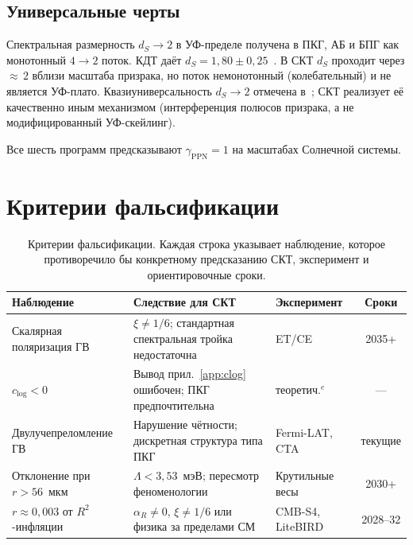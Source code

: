 \documentclass[12pt,a4paper]{article}
\theoremstyle{plain}
\theoremstyle{definition}
\theoremstyle{remark}
\begin{document}
{{{{{{\subsection{Универсальные черты}
\label{sec:universal}

Спектральная размерность $d_S \to 2$ в УФ-пределе получена в ПКГ,
АБ и БПГ как монотонный $4 \to 2$ поток. КДТ даёт
$d_S = 1{,}80 \pm 0{,}25$~\cite{AJL:2005}.
В СКТ $d_S$ проходит через ${\approx}\,2$ вблизи масштаба призрака,
но поток немонотонный (колебательный) и не является УФ-плато.
Квазиуниверсальность $d_S \to 2$ отмечена
в~\cite{Carlip:2017}; СКТ реализует её качественно иным механизмом
(интерференция полюсов призрака, а не модифицированный УФ-скейлинг).

Все шесть программ предсказывают $\gamma_{\mathrm{PPN}} = 1$ на
масштабах Солнечной системы.

\section{Критерии фальсификации}
\label{sec:falsification}

\begin{table}[ht]
\centering
\caption{Критерии фальсификации. Каждая строка указывает
наблюдение, которое противоречило бы конкретному предсказанию СКТ,
эксперимент и ориентировочные сроки.}
\label{tab:falsification}
\footnotesize
\setlength{\tabcolsep}{4pt}
\begin{tabular}{p{3.0cm}p{4.5cm}p{2.2cm}c}
\toprule
Наблюдение & Следствие для СКТ & Эксперимент & Сроки \\
\midrule
Скалярная поляризация ГВ &
  $\xi \neq 1/6$; стандартная спектральная тройка недостаточна &
  ET/CE & 2035+ \\[4pt]
$c_{\log} < 0$ &
  Вывод прил.~\ref{app:clog} ошибочен; ПКГ предпочтительна &
  теоретич.${}^e$ & --- \\[4pt]
Двулучепреломление ГВ &
  Нарушение чётности; дискретная структура типа ПКГ &
  Fermi-LAT, CTA & текущие \\[4pt]
Отклонение при $r > 56$~мкм &
  $\Lambda < 3{,}53$~мэВ; пересмотр феноменологии &
  Крутильные весы & 2030+ \\[4pt]
$r \approx 0{,}003$ от $R^2$-инфляции &
  $\alpha_R \neq 0$, $\xi \neq 1/6$ или физика за пределами СМ &
  CMB-S4, LiteBIRD & 2028--32 \\
\bottomrule
\end{tabular}


\end{table}}}}}}}
\end{document}

